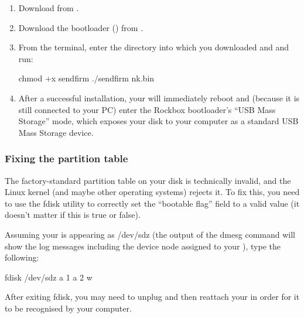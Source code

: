 \begin{enumerate}
\item Download  from .
\item Download the bootloader () from .
\item From the terminal, enter the directory into which you downloaded
 and  and run:
\begin{code} 
    chmod +x sendfirm 
    ./sendfirm nk.bin
\end{code}
\item After a successful installation, your \dap{} will immediately reboot
and (because it is still connected to your PC) enter the Rockbox bootloader's
``USB Mass Storage'' mode, which exposes your \daps{} disk to your computer
as a standard USB Mass Storage device.
\end{enumerate}

\subsubsection{Fixing the partition table}
The factory-standard partition table on your \daps{} disk is technically
invalid, and the Linux kernel (and maybe other operating systems) rejects it.
To fix this, you need to use the fdisk utility to correctly set the ``bootable
flag'' field to a valid value (it doesn't matter if this is true or false).\\


Assuming your \dap{} is appearing as /dev/sdz (the output of the dmesg
command will show the log messages including the device node assigned to
your \dap{}), type the following:

\begin{code}
    fdisk /dev/sdz
    a
    1
    a
    2
    w
\end{code}

After exiting fdisk, you may need to unplug and then reattach your \dap{}
in order for it to be recognised by your computer.